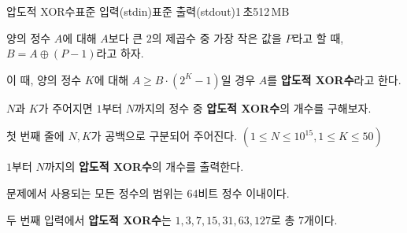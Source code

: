 \begin{problem}{압도적 XOR수}{표준 입력(stdin)}{표준 출력(stdout)}{1\,초}{512\,MB}

양의 정수 $A$에 대해 $A$보다 큰 $2$의 제곱수 중 가장 작은 값을 $P$라고 할 때, $B = A \oplus (P-1)$라고 하자.

이 때, 양의 정수 $K$에 대해 $A \geq B \cdot (2^K-1)$일 경우 $A$를 \textbf{압도적 XOR수}라고 한다.

$N$과 $K$가 주어지면 $1$부터 $N$까지의 정수 중 \textbf{압도적 XOR수}의 개수를 구해보자.

\InputFile
첫 번째 줄에 $N, K$가 공백으로 구분되어 주어진다. $(1 \leq N \leq 10^{15}, 1 \leq K \leq 50)$

\OutputFile
$1$부터 $N$까지의 \textbf{압도적 XOR수}의 개수를 출력한다. 

문제에서 사용되는 모든 정수의 범위는 64비트 정수 이내이다.

\Examples

\begin{example}
%
%
%
\end{example}

\Note
두 번째 입력에서 \textbf{압도적 XOR수}는 $1, 3, 7, 15, 31, 63, 127$로 총 $7$개이다.

\end{problem}
